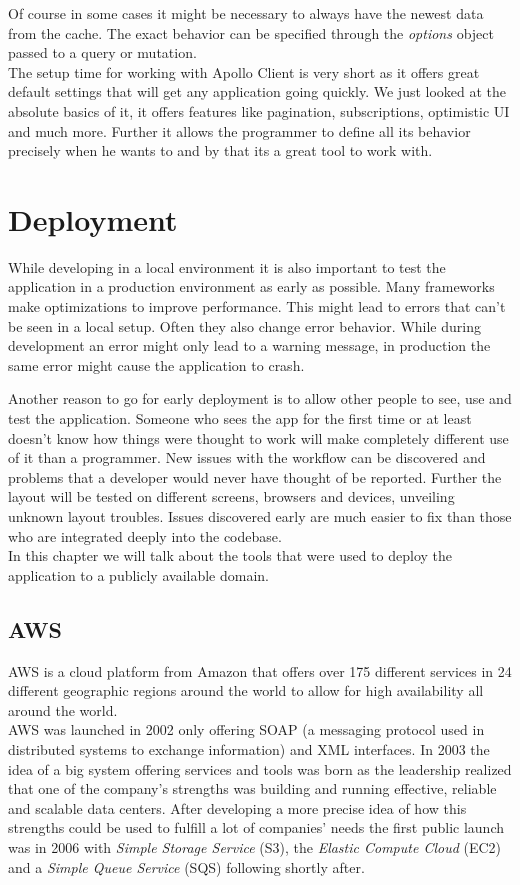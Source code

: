 Of course in some cases it might be necessary to always have the newest data from the cache. The exact behavior can be specified through the \emph{options} object passed to a query or mutation.
\\

The setup time for working with Apollo Client is very short as it offers great default settings that will get any application going quickly. We just looked at the absolute basics of it, it offers features like pagination, subscriptions, optimistic UI and much more.
Further it allows the programmer to define all its behavior precisely when he wants to and by that its a great tool to work with.

\chapter{Deployment}

While developing in a local environment it is also important to test the application in a production environment as early as possible. Many frameworks make optimizations to improve performance. This might lead to errors that can't be seen in a local setup. Often they also change error behavior. While during development an error might only lead to a warning message, in production the same error might cause the application to crash.

Another reason to go for early deployment is to allow other people to see, use and test the application. Someone who sees the app for the first time or at least doesn't know how things were thought to work will make completely different use of it than a programmer. New issues with the workflow can be discovered and problems that a developer would never have thought of be reported. Further the layout will be tested on different screens, browsers and devices, unveiling unknown layout troubles. Issues discovered early are much easier to fix than those who are integrated deeply into the codebase. \\

In this chapter we will talk about the tools that were used to deploy the application to a publicly available domain.

\section{AWS}
AWS is a cloud platform from Amazon that offers over 175 different services in 24 different geographic regions around the world to allow for high availability all around the world. \cite{WhatIsAws}\\
AWS was launched in 2002 only offering SOAP (a messaging protocol used in distributed systems to exchange information) and XML interfaces. \cite{HistoryAwsMedia} In 2003 the idea of a big system offering services and tools was born as the leadership realized that one of the company's strengths was building and running effective, reliable and scalable data centers. After developing a more precise idea of how this strengths could be used to fulfill a lot of companies' needs the first public launch was in 2006 with \emph{Simple Storage Service} (S3), the \emph{Elastic Compute Cloud} (EC2) and a \emph{Simple Queue Service} (SQS) following shortly after. \cite{HistoryAwsTech}

